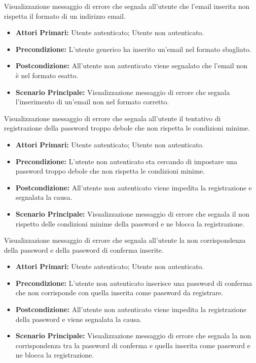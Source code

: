 Visualizzazione messaggio di errore che segnala all'utente che l'email inserita non rispetta il formato di un indirizzo email.
\begin{itemize}
    \item \textbf{Attori Primari:} Utente autenticato; Utente non autenticato.
    \item \textbf{Precondizione:} L'utente generico ha inserito un'email nel formato sbagliato.
    \item \textbf{Postcondizione:} All'utente non autenticato viene segnalato che l'email non è nel formato esatto.
    \item \textbf{Scenario Principale:} Visualizzazione messaggio di errore che segnala l'inserimento di un'email non nel formato corretto.
\end{itemize}

Visualizzazione messaggio di errore che segnala all'utente il tentativo di registrazione della password troppo debole che non rispetta le condizioni minime.
\begin{itemize}
    \item \textbf{Attori Primari:} Utente autenticato; Utente non autenticato.
    \item \textbf{Precondizione:} L'utente non autenticato sta cercando di impostare una password troppo debole che non rispetta le condizioni minime.
    \item \textbf{Postcondizione:} All'utente non autenticato viene impedita la registrazione e segnalata la causa.
    \item \textbf{Scenario Principale:} Visualizzazione messaggio di errore che segnala il non rispetto delle condizioni minime della password e ne blocca la registrazione.
\end{itemize}

Visualizzazione messaggio di errore che segnala all'utente la non corrispondenza della password e della password di conferma inserite.
\begin{itemize}
    \item \textbf{Attori Primari:} Utente autenticato; Utente non autenticato.
    \item \textbf{Precondizione:} L'utente non autenticato inserisce una password di conferma che non corrisponde con quella inserita come password da registrare.
    \item \textbf{Postcondizione:} All'utente non autenticato viene impedita la registrazione della password e viene segnalata la causa.
    \item \textbf{Scenario Principale:} Visualizzazione messaggio di errore che segnala la non corrispondenza tra la password di conferma e quella inserita come password e ne blocca la registrazione.
\end{itemize}

